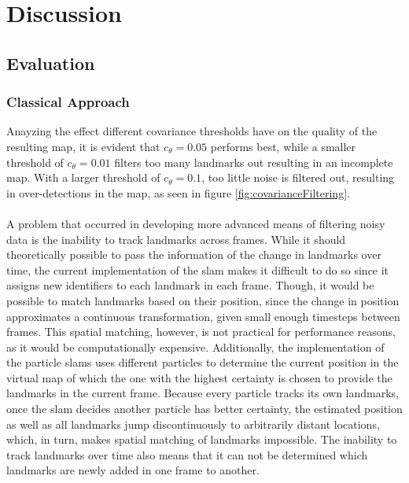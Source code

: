 \graphicspath{{Chapter/Figs/evaluation/}}
\chapter{Discussion}

\section{Evaluation}
\subsection{Classical Approach}
Anayzing the effect different covariance thresholds have on the quality of the resulting map, it is evident that $c_\theta=0.05$ performs best, while a smaller threshold of $c_\theta=0.01$ filters too many landmarks out resulting in an incomplete map. With a larger threshold of $c_\theta=0.1$, too little noise is filtered out, resulting in over-detections in the map, as seen in figure \ref{fig:covarianceFiltering}.\\
\\
A problem that occurred in developing more advanced means of filtering noisy data is the inability to track landmarks across frames. While it should theoretically possible to pass the information of the change in landmarks over time, the current implementation of the \ac{slam} makes it difficult to do so since it assigns new identifiers to each landmark in each frame. Though, it would be possible to match landmarks based on their position, since the change in position approximates a continuous transformation, given small enough timesteps between frames. This spatial matching, however, is not practical for performance reasons, as it would be computationally expensive. Additionally, the implementation of the particle \ac{slam}s uses different particles to determine the current position in the virtual map of which the one with the highest certainty is chosen to provide the landmarks in the current frame. Because every particle tracks its own landmarks, once the \ac{slam} decides another particle has better certainty, the estimated position as well as all landmarks jump discontinuously to arbitrarily distant locations, which, in turn, makes spatial matching of landmarks impossible. The inability to track landmarks over time also means that it can not be determined which landmarks are newly added in one frame to another.
